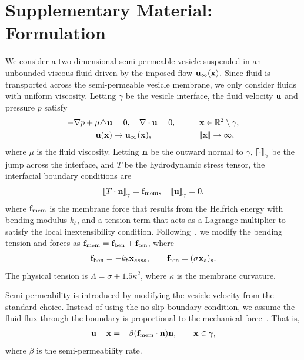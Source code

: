 \documentclass[9pt,twocolumn,twoside,lineno]{pnas-new}
\begin{document}
\section*{Supplementary Material: Formulation \label{sc:formulate}}
We consider a two-dimensional semi-permeable vesicle suspended in an
unbounded viscous fluid driven by the imposed flow $\mathbf{u}_\infty(\mathbf{x})$.
Since fluid is transported across the semi-permeable vesicle membrane,
we only consider fluids with uniform viscosity. Letting $\gamma$ be the
vesicle interface, the fluid velocity $\mathbf{u}$ and pressure $p$ satisfy
%
\begin{alignat}{3}
  \label{eqn:governing}
  -\nabla p + \mu \triangle \uu &= 0, \quad
  \nabla \cdot \uu = 0, \qquad &&\xx \in \RR^2 \setminus \gamma, \\
%
  \uu(\xx) &\rightarrow \uu_\infty(\xx),
    &&\norm{\xx} \rightarrow \infty,
\end{alignat}
where $\mu$ is the fluid viscosity. Letting $\mathbf{n}$ be the outward normal
to $\gamma$, $\left[\!\left[ \cdot \right]\!\right]_\gamma$ be the jump across the interface, and $T$ be
the hydrodynamic stress tensor, the interfacial boundary conditions are
\begin{align}
  \label{eqn:jump}
  \left[\!\left[ T\cdot\mathbf{n} \right]\!\right]_\gamma = \mathbf{f}_\mathrm{mem}, \quad \left[\!\left[ \mathbf{u} \right]\!\right]_\gamma = 0,
\end{align}
where $\mathbf{f}_\mathrm{mem}$ is the membrane force that results from the
Helfrich energy with bending modulus $k_b$, and a tension term that acts
as a Lagrange multiplier to satisfy the local inextensibility condition.
Following~\cite{vee-gue-zor-bir2009}, we modify the bending tension and
forces as
$\mathbf{f}_\mathrm{mem} = \mathbf{f}_\mathrm{ben} +
\mathbf{f}_\mathrm{ten}$, where
\begin{align}
  \label{eqn:membraneForces}
  \mathbf{f}_\mathrm{ben} = -k_b \mathbf{x}_{ssss}, \qquad
  \mathbf{f}_\mathrm{ten} = (\sigma \mathbf{x}_s)_s.
\end{align}
The physical tension is $\Lambda = \sigma + 1.5 \kappa^2$, where
$\kappa$ is the membrane curvature.

Semi-permeability is introduced by modifying the vesicle velocity from
the standard choice. Instead of using the no-slip boundary condition, we
assume the fluid flux through the boundary is proportional to the
mechanical force~\cite{yao-mor2017}. That is, 
\begin{align}
  \label{eqn:vesicleFlux}
  \mathbf{u} - \dot{\mathbf{x}} = - \beta (\mathbf{f}_\mathrm{mem} \cdot \mathbf{n}) \mathbf{n}, \qquad
  \mathbf{x} \in \gamma,
\end{align}
where $\beta$ is the semi-permeability rate.  
\end{document}

